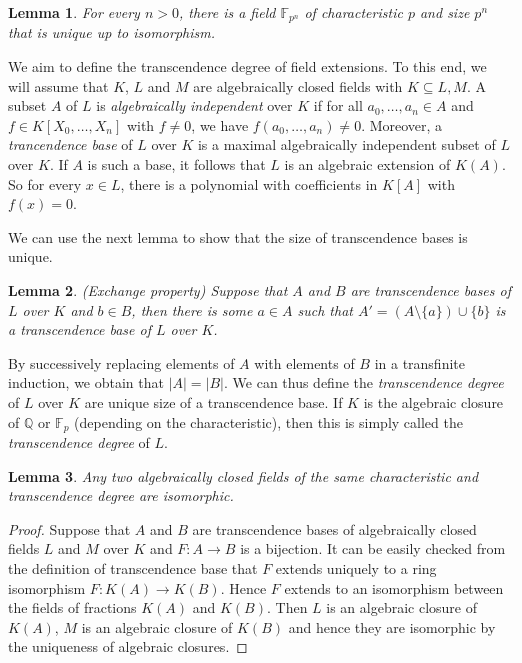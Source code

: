 \documentclass[a4paper, 11pt]{amsart}
\newtheorem{lemma}[lemma]{Lemma}
\theoremstyle{remark}
\newcommand{\QQ}{\mathbb{Q}}
\begin{document}
\begin{lemma} 
For every $n>0$, there is a field $\mathbb{F}_{p^n}$ of characteristic $p$ and size $p^n$ that is unique up to isomorphism. 
\end{lemma} 



We aim to define the transcendence degree of field extensions. To this end, we will assume that $K$, $L$ and $M$ are algebraically closed fields with $K\subseteq L, M$. A subset $A$ of $L$ is \emph{algebraically independent} over $K$ if for all $a_0,\dots,a_n\in A$ and $f\in K[X_0,\dots,X_n]$ with $f\neq 0$, we have $f(a_0,\dots,a_n)\neq 0$. Moreover, a \emph{trancendence base} of $L$ over $K$ is a maximal algebraically independent subset of $L$ over $K$. If $A$ is such a base, it follows that $L$ is an algebraic extension of $K(A)$. 
So for every $x\in L$, there is a polynomial with coefficients in $K[A]$ with $f(x)=0$. 

We can use the next lemma to show that the size of transcendence bases is unique. 

\begin{lemma} (Exchange property) 
Suppose that $A$ and $B$ are transcendence bases of $L$ over $K$ and $b\in B$, then there is some $a\in A$ such that $A'=(A\setminus \{a\})\cup \{b\}$ is a transcendence base of $L$ over $K$. 
\end{lemma} 



By successively replacing elements of $A$ with elements of $B$ in a transfinite induction, we obtain that $|A|=|B|$. We can thus define the \emph{transcendence degree} of $L$ over $K$ are unique size of a transcendence base. If $K$ is the algebraic closure of $\QQ$ or $\mathbb{F}_p$ (depending on the characteristic), then this is simply called the \emph{transcendence degree} of $L$. 





\begin{lemma} 
Any two algebraically closed fields of the same characteristic and transcendence degree are isomorphic. 
\end{lemma} 
\begin{proof} 
Suppose that 
$A$ and $B$ are transcendence bases of algebraically closed fields $L$ and $M$ over $K$ and $F\colon A\rightarrow B$ is a bijection. 
It can be easily checked from the definition of transcendence base that $F$ extends uniquely to a ring isomorphism $F\colon K(A)\rightarrow K(B)$. 
Hence $F$ extends to an isomorphism between the fields of fractions $K(A)$ and $K(B)$. 
Then $L$ is an algebraic closure of $K(A)$, $M$ is an algebraic closure of $K(B)$ and hence they are isomorphic by the uniqueness of algebraic closures. 
\end{proof} 
\end{document}
